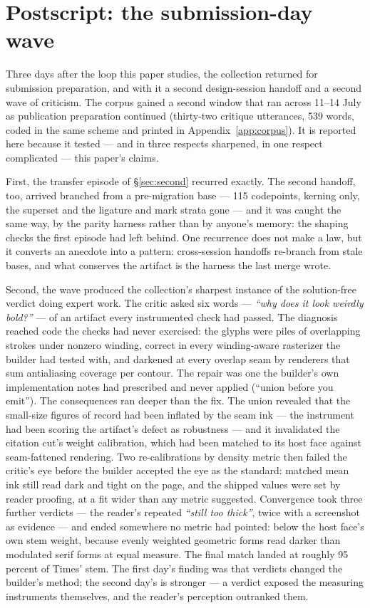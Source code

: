 \documentclass[12pt]{article}
\begin{document}
\section{Postscript: the submission-day wave}\label{sec:day2}

Three days after the loop this paper studies, the collection returned for submission preparation, and with it a second design-session handoff and a second wave of criticism. The corpus gained a second window that ran across 11--14 July as publication preparation continued (thirty-two critique utterances, 539 words, coded in the same scheme and printed in Appendix~\ref{app:corpus}). It is reported here because it tested — and in three respects sharpened, in one respect complicated — this paper's claims.

First, the transfer episode of \S\ref{sec:second} recurred exactly. The second handoff, too, arrived branched from a pre-migration base — 115 codepoints, kerning only, the superset and the ligature and mark strata gone — and it was caught the same way, by the parity harness rather than by anyone's memory: the shaping checks the first episode had left behind. One recurrence does not make a law, but it converts an anecdote into a pattern: cross-session handoffs re-branch from stale bases, and what conserves the artifact is the harness the last merge wrote.

Second, the wave produced the collection's sharpest instance of the solution-free verdict doing expert work. The critic asked six words — \emph{``why does it look weirdly bold?''} — of an artifact every instrumented check had passed. The diagnosis reached code the checks had never exercised: the glyphs were piles of overlapping strokes under nonzero winding, correct in every winding-aware rasterizer the builder had tested with, and darkened at every overlap seam by renderers that sum antialiasing coverage per contour. The repair was one the builder's own implementation notes had prescribed and never applied (``union before you emit''). The consequences ran deeper than the fix. The union revealed that the small-size figures of record had been inflated by the seam ink — the instrument had been scoring the artifact's defect as robustness — and it invalidated the citation cut's weight calibration, which had been matched to its host face against seam-fattened rendering. Two re-calibrations by density metric then failed the critic's eye before the builder accepted the eye as the standard: matched mean ink still read dark and tight on the page, and the shipped values were set by reader proofing, at a fit wider than any metric suggested. Convergence took three further verdicts — the reader's repeated \emph{``still too thick''}, twice with a screenshot as evidence — and ended somewhere no metric had pointed: below the host face's own stem weight, because evenly weighted geometric forms read darker than modulated serif forms at equal measure. The final match landed at roughly 95 percent of Times' stem. The first day's finding was that verdicts changed the builder's method; the second day's is stronger — a verdict exposed the measuring instruments themselves, and the reader's perception outranked them.
\end{document}
